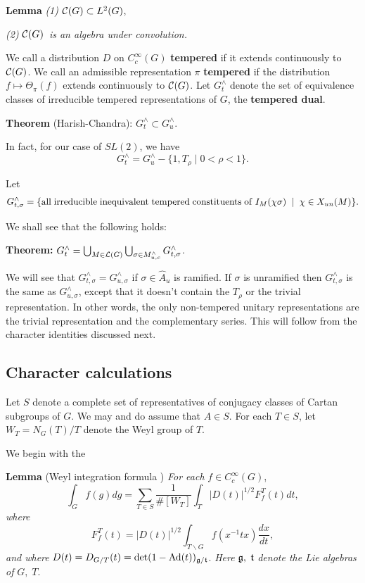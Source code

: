 \documentclass[11pt, a4paper]{article}
\begin{document}
{\bf Lemma} {\em (1) }${\cal C}(G)\subset L^2(G)$,

{\em (2) }${\cal C}(G)${\em \ is an algebra under convolution.}

We call a distribution $D$ on $C_c^\infty (G)$ {\bf tempered} if it extends
continuously to ${\cal C}(G)$. We call an admissible representation $\pi $ 
{\bf tempered} if the distribution $f\longmapsto \Theta _\pi (f)$ extends
continuously to ${\cal C}(G)$. Let $G_t^{\wedge }$ denote the set of
equivalence classes of irreducible tempered representations of $G$, the {\bf %
tempered dual}.

{\bf Theorem} (Harish-Chandra): $G_t^{\wedge }\subset G_u^{\wedge }$.

In fact, for our case of $SL(2)$, we have
\[
G_t^{\wedge }=G_u^{\wedge }-\{1,T_\rho \;|\;0<\rho <1\}.
\]

Let
\[
G_{t,\sigma }^{\wedge }=\{{\rm all\;irreducible\;inequivalent\;tempered\;%
constituents\;of\;}I_M(\chi \sigma )\;\;|\;\;\chi \in X_{un}(M)\}.
\]

We shall see that the following holds:

{\bf Theorem:} $G_t^{\wedge }=\bigcup_{M\in {\cal L}(G)}\bigcup_{\sigma \in
M_{u,c}^{\wedge }}G_{t,\sigma }^{\wedge }$.

We will see that $G_{t,\sigma }^{\wedge }=G_{u,\sigma }^{\wedge }$ if $%
\sigma\in\hat{A}_u$ is ramified. If $\sigma$ is unramified then $G_{t,\sigma
}^{\wedge }$ is the same as $G_{u,\sigma }^{\wedge }$, except that it doesn't
contain the $T_\rho$ or the trivial representation. In other words, the only
non-tempered unitary representations are the trivial representation and the
complementary series. This will follow from the character identities
discussed next.

\subsection{Character calculations}

Let $S$ denote a complete set of representatives of conjugacy classes of
Cartan subgroups of $G$. We may and do assume that $A\in S$. For each $T\in
S$, let $W_T=N_G(T)/T$ denote the Weyl group of $T$.

We begin with the

{\bf Lemma} (Weyl integration formula \cite[p.~198]{S}) {\em For each }$f\in
C_c^\infty (G)$,
\[
\int_Gf(g)dg=\sum_{T\in S}\frac 1{\#[W_T]}\int_T|D(t)|^{1/2}F_f^T(t)dt,
\]
{\em where}
\[
F_f^T(t)=|D(t)|^{1/2}\int_{T\backslash G}f(x^{-1}tx)\frac{dx}{dt},
\]
{\em and where }$D(t)=D_{G/T}(t)=\det (1-\mathrm{Ad}(t))_{{\frak g}/{\frak t}%
}$. {\em Here }${\frak g},\;{\frak t}$ {\em denote the Lie algebras of }$G,\;T$.
\end{document}
